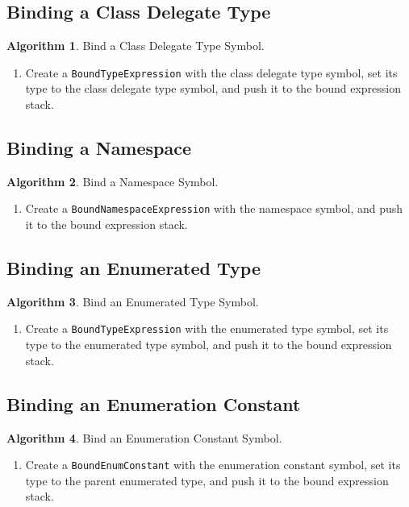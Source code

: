 \documentclass[a4paper,oneside,11pt]{book}
\theoremstyle{definition}
\newtheorem{algo}{Algorithm}[section]
\begin{document}
\subsection{Binding a Class Delegate Type}

\begin{algo}\label{bindclassdelegatetypesymbol} Bind a Class Delegate Type Symbol.
\begin{enumerate}
\item
Create a \verb|BoundTypeExpression| with the class delegate type symbol, set its type to the class delegate type symbol, and push it to the bound expression stack.
\end{enumerate}
\end{algo}

\subsection{Binding a Namespace}

\begin{algo}\label{bindnamespacesymbol} Bind a Namespace Symbol.
\begin{enumerate}
\item
Create a \verb|BoundNamespaceExpression| with the namespace symbol, and push it to the bound expression stack.
\end{enumerate}
\end{algo}

\subsection{Binding an Enumerated Type}

\begin{algo}\label{bindenumtypesymbol} Bind an Enumerated Type Symbol.
\begin{enumerate}
\item
Create a \verb|BoundTypeExpression| with the enumerated type symbol, set its type to the enumerated type symbol, and push it to the bound expression stack.
\end{enumerate}
\end{algo}

\subsection{Binding an Enumeration Constant}

\begin{algo}\label{bindenumconstantsymbol} Bind an Enumeration Constant Symbol.
\begin{enumerate}
\item
Create a \verb|BoundEnumConstant| with the enumeration constant symbol, set its type to the parent enumerated type, and push it to the bound expression stack.
\end{enumerate}
\end{algo}
\end{document}
